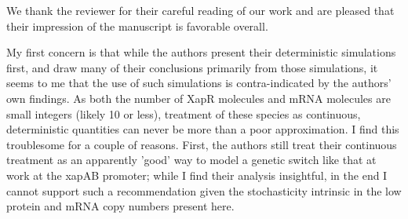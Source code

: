 \documentclass[11pt,letterpaper]{article}
\begin{document}
\begin{response}
We thank the reviewer for their careful reading of our work and are
pleased that their impression of the manuscript is favorable overall.
\end{response}

\begin{review}
My first concern is that while the authors present their deterministic
simulations first, and draw many of their conclusions primarily from
those simulations, it seems to me that the use of such simulations is
contra-indicated by the authors' own findings. As both the number of
XapR molecules and mRNA molecules are small integers (likely 10 or
less), treatment of these species as continuous, deterministic
quantities can never be more than a poor approximation. I find this
troublesome for a couple of reasons. First, the authors still treat
their continuous treatment as an apparently 'good' way to model a
genetic switch like that at work at the xapAB promoter; while I find
their analysis insightful, in the end I cannot support such a
recommendation given the stochasticity intrinsic in the low protein and
mRNA copy numbers present here.
\end{review}
\end{document}
